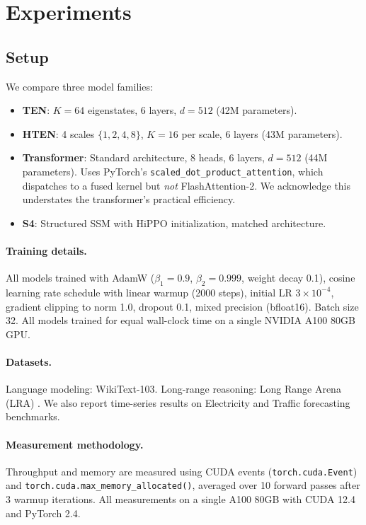 \documentclass{article}
\begin{document}
\section{Experiments}
\label{sec:experiments}

\subsection{Setup}

We compare three model families:

\begin{itemize}
\item \textbf{TEN}: $K = 64$ eigenstates, 6 layers, $d = 512$ (42M parameters).
\item \textbf{HTEN}: 4 scales $\{1, 2, 4, 8\}$, $K = 16$ per scale, 6 layers (43M parameters).
\item \textbf{Transformer}: Standard architecture, 8 heads, 6 layers, $d = 512$ (44M parameters). Uses PyTorch's \texttt{scaled\_dot\_product\_attention}, which dispatches to a fused kernel but \emph{not} FlashAttention-2. We acknowledge this understates the transformer's practical efficiency.
\item \textbf{S4}: Structured SSM with HiPPO initialization, matched architecture.
\end{itemize}

\paragraph{Training details.}
All models trained with AdamW ($\beta_1 = 0.9$, $\beta_2 = 0.999$, weight decay 0.1), cosine learning rate schedule with linear warmup (2000 steps), initial LR $3 \times 10^{-4}$, gradient clipping to norm 1.0, dropout 0.1, mixed precision (bfloat16). Batch size 32. All models trained for equal wall-clock time on a single NVIDIA A100 80GB GPU.

\paragraph{Datasets.}
Language modeling: WikiText-103. Long-range reasoning: Long Range Arena (LRA) \cite{tay2021long}. We also report time-series results on Electricity and Traffic forecasting benchmarks.

\paragraph{Measurement methodology.}
Throughput and memory are measured using CUDA events (\texttt{torch.cuda.Event}) and \texttt{torch.cuda.max\_memory\_allocated()}, averaged over 10 forward passes after 3 warmup iterations. All measurements on a single A100 80GB with CUDA 12.4 and PyTorch 2.4.
\end{document}
